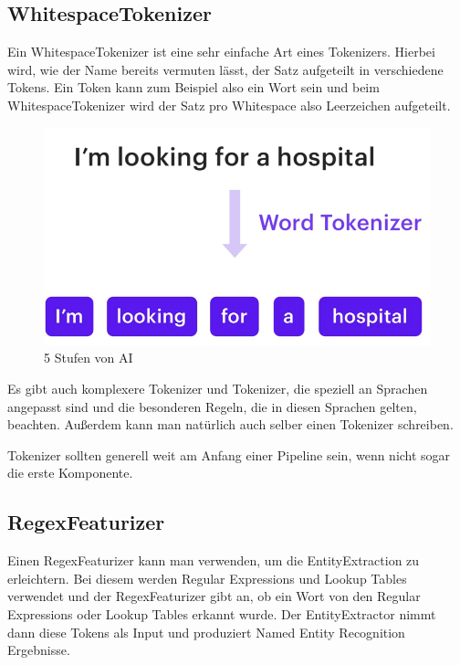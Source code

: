 \subsection{WhitespaceTokenizer}

Ein WhitespaceTokenizer ist eine sehr einfache Art eines Tokenizers.
Hierbei wird, wie der Name bereits vermuten lässt, der Satz aufgeteilt in verschiedene Tokens.
Ein Token kann zum Beispiel also ein Wort sein und beim WhitespaceTokenizer wird der Satz pro Whitespace also Leerzeichen aufgeteilt.\cite{whitespaceTokenizer, rasaMasterclassWhitespaceTokenizer, pipelineComponentsYoutube}

\begin{figure}
  \centering
  \includegraphics[scale=0.25]{pics/whitespacetokenizer}
  \caption{5 Stufen von AI~\cite{pipelineComponentsYoutube}}
  \label{fig:WhitespaceTokenizer}
\end{figure}

Es gibt auch komplexere Tokenizer und Tokenizer, die speziell an Sprachen angepasst sind und die besonderen Regeln, die in diesen Sprachen gelten, beachten.
Außerdem kann man natürlich auch selber einen Tokenizer schreiben.\cite{whitespaceTokenizer, rasaMasterclassWhitespaceTokenizer, pipelineComponentsYoutube}

Tokenizer sollten generell weit am Anfang einer Pipeline sein, wenn nicht sogar die erste Komponente.

\subsection{RegexFeaturizer}

Einen RegexFeaturizer kann man verwenden, um die EntityExtraction zu erleichtern.
Bei diesem werden Regular Expressions und Lookup Tables verwendet und der RegexFeaturizer gibt an, ob ein Wort von den Regular Expressions oder Lookup Tables erkannt wurde.
Der EntityExtractor nimmt dann diese Tokens als Input und produziert Named Entity Recognition Ergebnisse.\cite{rasaMasterclassRegexFeaturizer, pipelineComponentsYoutube, regexFeaturizerCrf}

